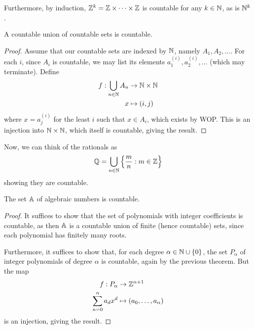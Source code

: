 \documentclass{../template/note}
\begin{document}
    Furthermore, by induction, \(\ZZ^k = \ZZ \times \cdots \times \ZZ\) is countable for any \(k \in \NN\), as is \(\NN^k\).
    
    \begin{theorem}
        \label{countable-union}
        A countable union of countable sets is countable.
    \end{theorem}
    
    \begin{proof}
        Assume that our countable sets are indexed by \(\NN\), namely \(A_1, A_2, \dots\). For each \(i\), since \(A_i\) is countable, we may list its elements \(a_1^{(i)}, a_2^{(i)}, \dots\) (which may terminate). Define
        \begin{align*}
            f: \bigcup_{n \in \NN} A_n &\to \NN \times \NN \\
            x &\mapsto (i, j)
        \end{align*}
        where \(x = a_j^{(i)}\) for the least \(i\) such that \(x \in A_i\), which exists by WOP. This is an injection into \(\NN \times \NN\), which itself is countable, giving the result.
    \end{proof}
    
    Now, we can think of the rationals as
    \begin{align*}
        \QQ = \bigcup_{n \in \NN} \left\{\frac m n : m \in \ZZ\right\}
    \end{align*}
    showing they are countable.
    
    \begin{theorem}
        The set \(\AA\) of algebraic numbers is countable.
    \end{theorem}
    
    \begin{proof}
        It suffices to show that the set of polynomials with integer coefficients is countable, as then \(\AA\) is a countable union of finite (hence countable) sets, since each polynomial has finitely many roots.

        Furthermore, it suffices to show that, for each degree \(\alpha \in \NN \cup \{0\}\), the set \(P_\alpha\) of integer polynomials of degree \(\alpha\) is countable, again by the previous theorem. But the map
        \begin{align*}
            f: P_\alpha &\to \ZZ^{\alpha+1} \\
            \sum_{n=0}^\alpha a_dx^d &\mapsto (a_0, \dots, a_\alpha)
        \end{align*}
        is an injection, giving the result.
    \end{proof}
    
\end{document}
